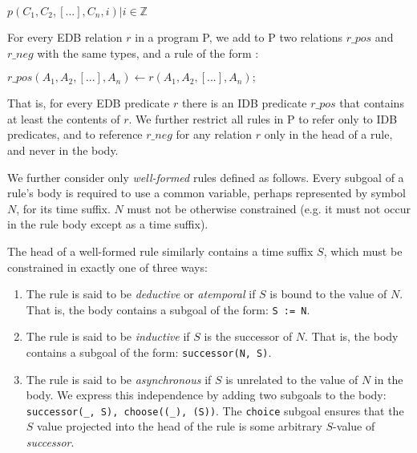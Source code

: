 \documentclass{acm_proc_article-sp-sigmod09}
\newcommand{\wrm}[1]{{\color{BurntOrange}{#1 -- wrm}}}
\newcommand{\dedalus}[1]{\texttt{\fontsize{9pt}{9pt}\selectfont #1}}
\begin{document}
$p(C_{1},C_{2},[...],C_{n}, i) |  i \in \mathbb{Z}$


For every EDB relation $r$ in a program P, we add to P two relations $r\_pos$ and $r\_neg$ with the same types, and a rule of the form \wrm{is this fundamental to the language, or is it just a rewrite that we do for operational purposes}:

$r\_pos(A_1, A_2, [...], A_n) \leftarrow r(A_1, A_2, [...], A_n);$

That is, for every EDB predicate $r$ there is an IDB predicate $r\_pos$ that contains at least the contents of $r$.
We further restrict all rules in P to refer only to IDB predicates, and to reference $r\_neg$ for any relation $r$ only 
in the head of a rule, and never in the body.  



We further consider only \emph{well-formed} rules defined as follows.  Every
subgoal of a rule's body is required to use a common variable, perhaps
represented by symbol $N$, for its time suffix.  $N$ must not be otherwise
constrained (e.g. it must not occur in the rule body except as a time suffix).


The head of a well-formed rule similarly contains a time suffix $S$, which must
be constrained in exactly one of three ways:

\begin{enumerate}

\item The rule is said to be \emph{deductive} or {\em atemporal} if $S$ is
bound to the value of $N$.  That is, the body contains a subgoal of the form:
\dedalus{S := N}.

\item The rule is said to be {\em inductive} if $S$ is the successor
of $N$.  That is, the body contains a subgoal of the form:
\dedalus{successor(N, S)}.

\item The rule is said to be {\em asynchronous} if $S$ is unrelated to the
value of $N$ in the body.  We express this independence by adding two subgoals
to the body: \dedalus{successor(\_, S), choose((\_), (S))}.  The
\dedalus{choice} subgoal ensures that the $S$ value projected into the head of
the rule is some arbitrary $S$-value of \emph{successor}. \wrm{Why can't we
select the initial time?  What we should do instead is have some unary relation
time(T) that captures all possible times, and choose from this relation
instead.  We can assume an inclusion constraint forcing successor's arguments
to both come from this relation.}

\end{enumerate}
\end{document}
